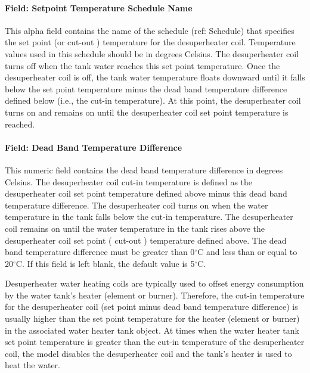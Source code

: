 \paragraph{Field: Setpoint Temperature Schedule Name}\label{field-setpoint-temperature-schedule-name}

This alpha field contains the name of the schedule (ref: Schedule) that specifies the set point (or cut-out ) temperature for the desuperheater coil. Temperature values used in this schedule should be in degrees Celsius. The desuperheater coil turns off when the tank water reaches this set point temperature. Once the desuperheater coil is off, the tank water temperature floats downward until it falls below the set point temperature minus the dead band temperature difference defined below (i.e., the cut-in temperature). At this point, the desuperheater coil turns on and remains on until the desuperheater coil set point temperature is reached.

\paragraph{Field: Dead Band Temperature Difference}\label{field-dead-band-temperature-difference}

This numeric field contains the dead band temperature difference in degrees Celsius. The desuperheater coil cut-in temperature is defined as the desuperheater coil set point temperature defined above minus this dead band temperature difference. The desuperheater coil turns on when the water temperature in the tank falls below the cut-in temperature. The desuperheater coil remains on until the water temperature in the tank rises above the desuperheater coil set point ( cut-out ) temperature defined above. The dead band temperature difference must be greater than 0$^\circ$C and less than or equal to 20$^\circ$C. If this field is left blank, the default value is 5$^\circ$C.

Desuperheater water heating coils are typically used to offset energy consumption by the water tank's heater (element or burner). Therefore, the cut-in temperature for the desuperheater coil (set point minus dead band temperature difference) is usually higher than the set point temperature for the heater (element or burner) in the associated water heater tank object. At times when the water heater tank set point temperature is greater than the cut-in temperature of the desuperheater coil, the model disables the desuperheater coil and the tank's heater is used to heat the water.

